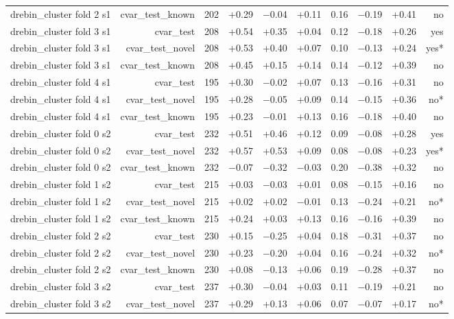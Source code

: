 \begin{table}[t]
\begin{tabular}{lrrrrrrrrr}
drebin\_cluster fold 2 s1 & cvar\_test\_known & 202 & +0.29 & $-$0.04 & +0.11 & 0.16 & $-$0.19 & +0.41 & no \\
drebin\_cluster fold 3 s1 & cvar\_test & 208 & +0.54 & +0.35 & +0.04 & 0.12 & $-$0.18 & +0.26 & yes \\
drebin\_cluster fold 3 s1 & cvar\_test\_novel & 208 & +0.53 & +0.40 & +0.07 & 0.10 & $-$0.13 & +0.24 & yes* \\
drebin\_cluster fold 3 s1 & cvar\_test\_known & 208 & +0.45 & +0.15 & +0.14 & 0.14 & $-$0.12 & +0.39 & no \\
drebin\_cluster fold 4 s1 & cvar\_test & 195 & +0.30 & $-$0.02 & +0.07 & 0.13 & $-$0.16 & +0.31 & no \\
drebin\_cluster fold 4 s1 & cvar\_test\_novel & 195 & +0.28 & $-$0.05 & +0.09 & 0.14 & $-$0.15 & +0.36 & no* \\
drebin\_cluster fold 4 s1 & cvar\_test\_known & 195 & +0.23 & $-$0.01 & +0.13 & 0.16 & $-$0.18 & +0.40 & no \\
drebin\_cluster fold 0 s2 & cvar\_test & 232 & +0.51 & +0.46 & +0.12 & 0.09 & $-$0.08 & +0.28 & yes \\
drebin\_cluster fold 0 s2 & cvar\_test\_novel & 232 & +0.57 & +0.53 & +0.09 & 0.08 & $-$0.08 & +0.23 & yes* \\
drebin\_cluster fold 0 s2 & cvar\_test\_known & 232 & $-$0.07 & $-$0.32 & $-$0.03 & 0.20 & $-$0.38 & +0.32 & no \\
drebin\_cluster fold 1 s2 & cvar\_test & 215 & +0.03 & $-$0.03 & +0.01 & 0.08 & $-$0.15 & +0.16 & no \\
drebin\_cluster fold 1 s2 & cvar\_test\_novel & 215 & +0.02 & +0.02 & $-$0.01 & 0.13 & $-$0.24 & +0.21 & no* \\
drebin\_cluster fold 1 s2 & cvar\_test\_known & 215 & +0.24 & +0.03 & +0.13 & 0.16 & $-$0.16 & +0.39 & no \\
drebin\_cluster fold 2 s2 & cvar\_test & 230 & +0.15 & $-$0.25 & +0.04 & 0.18 & $-$0.31 & +0.37 & no \\
drebin\_cluster fold 2 s2 & cvar\_test\_novel & 230 & +0.23 & $-$0.20 & +0.04 & 0.16 & $-$0.24 & +0.32 & no* \\
drebin\_cluster fold 2 s2 & cvar\_test\_known & 230 & +0.08 & $-$0.13 & +0.06 & 0.19 & $-$0.28 & +0.37 & no \\
drebin\_cluster fold 3 s2 & cvar\_test & 237 & +0.30 & $-$0.04 & +0.03 & 0.11 & $-$0.19 & +0.21 & no \\
drebin\_cluster fold 3 s2 & cvar\_test\_novel & 237 & +0.29 & +0.13 & +0.06 & 0.07 & $-$0.07 & +0.17 & no* \\

\end{tabular}
\end{table}
